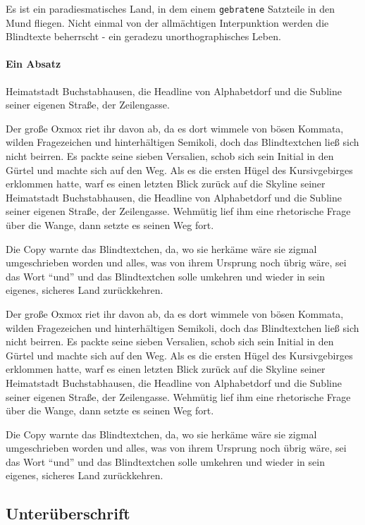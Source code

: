 \documentclass[%
	12pt,%
	a4paper,%
	oneside,%
	liststotoc, idxtotoc, bibtotoc, %
	parskip=half,%
	nochapterprefix,%
	appendixprefix, %
	headings=small,%
]{scrreprt}
\begin{document}
Es ist ein paradiesmatisches Land, in dem einem \texttt{gebratene} Satzteile in den Mund fliegen. Nicht einmal von der allmächtigen Interpunktion werden die Blindtexte beherrscht - ein geradezu unorthographisches Leben. 

\paragraph{Ein Absatz} Heimatstadt Buchstabhausen, die Headline von Alphabetdorf und die Subline seiner eigenen Straße, der Zeilengasse.

Der große Oxmox riet ihr davon ab, da es dort wimmele von bösen Kommata, wilden Fragezeichen und hinterhältigen Semikoli, doch das Blindtextchen ließ sich nicht beirren. Es packte seine sieben Versalien, schob sich sein Initial in den Gürtel und machte sich auf den Weg. Als es die ersten Hügel des Kursivgebirges erklommen hatte, warf es einen letzten Blick zurück auf die Skyline seiner Heimatstadt Buchstabhausen, die Headline von Alphabetdorf und die Subline seiner eigenen Straße, der Zeilengasse. Wehmütig lief ihm eine rhetorische Frage über die Wange, dann setzte es seinen Weg fort.

Die Copy warnte das Blindtextchen, da, wo sie herkäme wäre sie zigmal umgeschrieben worden und alles, was von ihrem Ursprung noch übrig wäre, sei das Wort "`und"'  und das Blindtextchen solle umkehren und wieder in sein eigenes, sicheres Land zurückkehren.

Der große Oxmox riet ihr davon ab, da es dort wimmele von bösen Kommata, wilden Fragezeichen und hinterhältigen Semikoli, doch das Blindtextchen ließ sich nicht beirren. Es packte seine sieben Versalien, schob sich sein Initial in den Gürtel und machte sich auf den Weg. Als es die ersten Hügel des Kursivgebirges erklommen hatte, warf es einen letzten Blick zurück auf die Skyline seiner Heimatstadt Buchstabhausen, die Headline von Alphabetdorf und die Subline seiner eigenen Straße, der Zeilengasse. Wehmütig lief ihm eine rhetorische Frage über die Wange, dann setzte es seinen Weg fort.

Die Copy warnte das Blindtextchen, da, wo sie herkäme wäre sie zigmal umgeschrieben worden und alles, was von ihrem Ursprung noch übrig wäre, sei das Wort "`und"'  und das Blindtextchen solle umkehren und wieder in sein eigenes, sicheres Land zurückkehren.

\subsection{Unterüberschrift}
\end{document}

